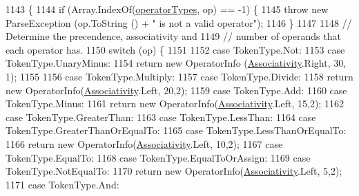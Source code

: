 \begin{DoxyCode}
1143                                                                        \{
1144                 \textcolor{keywordflow}{if} (Array.IndexOf(\hyperlink{a00072_a8dca7db3b76b8c358aba6068274e07df}{operatorTypes}, op) == -1) \{
1145                     \textcolor{keywordflow}{throw} \textcolor{keyword}{new} ParseException (op.ToString () + \textcolor{stringliteral}{" is not a valid operator"});
1146                 \}
1147 
1148                 \textcolor{comment}{// Determine the precendence, associativity and}
1149                 \textcolor{comment}{// number of operands that each operator has.}
1150                 \textcolor{keywordflow}{switch} (op) \{
1151 
1152                 \textcolor{keywordflow}{case} TokenType.Not:
1153                 \textcolor{keywordflow}{case} TokenType.UnaryMinus:
1154                     \textcolor{keywordflow}{return} \textcolor{keyword}{new} OperatorInfo (\hyperlink{a00072_a83fa1b8db0e6678006920812b6f33f62}{Associativity}.Right, 30, 1);
1155 
1156                 \textcolor{keywordflow}{case} TokenType.Multiply:
1157                 \textcolor{keywordflow}{case} TokenType.Divide:
1158                     \textcolor{keywordflow}{return} \textcolor{keyword}{new} OperatorInfo(\hyperlink{a00072_a83fa1b8db0e6678006920812b6f33f62}{Associativity}.Left, 20,2);
1159                 \textcolor{keywordflow}{case} TokenType.Add:
1160                 \textcolor{keywordflow}{case} TokenType.Minus:
1161                     \textcolor{keywordflow}{return} \textcolor{keyword}{new} OperatorInfo(\hyperlink{a00072_a83fa1b8db0e6678006920812b6f33f62}{Associativity}.Left, 15,2);
1162                 \textcolor{keywordflow}{case} TokenType.GreaterThan:
1163                 \textcolor{keywordflow}{case} TokenType.LessThan:
1164                 \textcolor{keywordflow}{case} TokenType.GreaterThanOrEqualTo:
1165                 \textcolor{keywordflow}{case} TokenType.LessThanOrEqualTo:
1166                     \textcolor{keywordflow}{return} \textcolor{keyword}{new} OperatorInfo(\hyperlink{a00072_a83fa1b8db0e6678006920812b6f33f62}{Associativity}.Left, 10,2);
1167                 \textcolor{keywordflow}{case} TokenType.EqualTo:
1168                 \textcolor{keywordflow}{case} TokenType.EqualToOrAssign:
1169                 \textcolor{keywordflow}{case} TokenType.NotEqualTo:
1170                     \textcolor{keywordflow}{return} \textcolor{keyword}{new} OperatorInfo(\hyperlink{a00072_a83fa1b8db0e6678006920812b6f33f62}{Associativity}.Left, 5,2);
1171                 \textcolor{keywordflow}{case} TokenType.And:

\end{DoxyCode}
